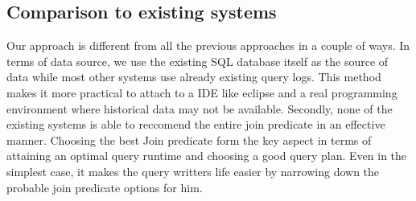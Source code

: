 \documentclass{acm_proc_article-sp}
\begin{document}
\subsection{Comparison to existing systems}
Our approach is different from all the previous approaches in a couple of ways. In terms of data source, we use the existing SQL database itself as the source of data while most other systems use already existing query logs. This method makes it more practical to attach to a IDE like eclipse and a real programming environment where historical data may not be available. Secondly, none of the existing systems is able to reccomend the entire join predicate in an effective manner.  Choosing the best Join predicate form the key aspect in terms of attaining an optimal query runtime and choosing a good query plan. Even in the simplest case, it makes the query writters life easier by narrowing down the probable join predicate options for him. 
\end{document}

